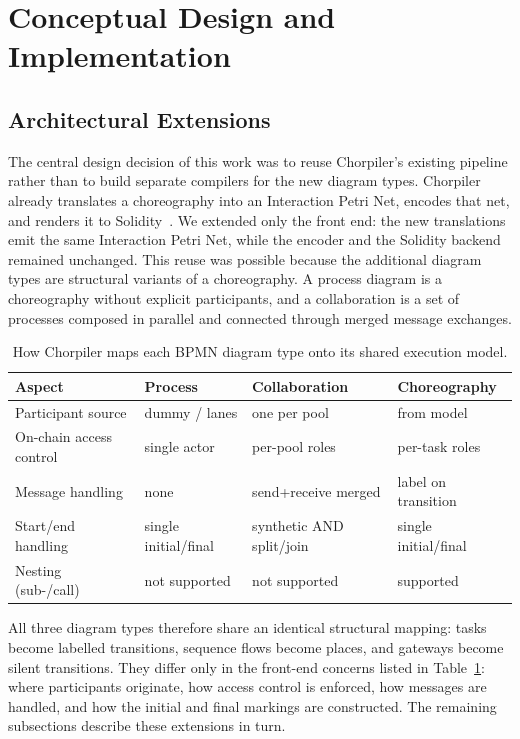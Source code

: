 \documentclass[runningheads]{llncs}
\begin{document}
\section{Conceptual Design and Implementation}
\label{sec:implementation}

\subsection{Architectural Extensions}
The central design decision of this work was to reuse Chorpiler's existing pipeline rather than to build separate compilers for the new diagram types. Chorpiler already translates a choreography into an Interaction Petri Net, encodes that net, and renders it to Solidity~\cite{decker,garcia}. We extended only the front end: the new translations emit the same Interaction Petri Net, while the encoder and the Solidity backend remained unchanged. This reuse was possible because the additional diagram types are structural variants of a choreography. A process diagram is a choreography without explicit participants, and a collaboration is a set of processes composed in parallel and connected through merged message exchanges.

\begin{table}[t]
\centering
\caption{How Chorpiler maps each BPMN diagram type onto its shared execution model.}
\label{tab:chorpiler-mapping}
\begin{tabular}{@{}llll@{}}
\toprule
\textbf{Aspect} & \textbf{Process} & \textbf{Collaboration} & \textbf{Choreography} \\
\midrule
Participant source      & dummy / lanes            & one per pool             & from model \\
On-chain access control & single actor             & per-pool roles           & per-task roles \\
Message handling        & none                     & send+receive merged      & label on transition \\
Start/end handling      & single initial/final     & synthetic AND split/join & single initial/final \\
Nesting (sub-/call)     & not supported            & not supported            & supported \\
\bottomrule
\end{tabular}
\end{table}

All three diagram types therefore share an identical structural mapping: tasks become labelled transitions, sequence flows become places, and gateways become silent transitions. They differ only in the front-end concerns listed in Table~\ref{tab:chorpiler-mapping}: where participants originate, how access control is enforced, how messages are handled, and how the initial and final markings are constructed. The remaining subsections describe these extensions in turn.
\end{document}
